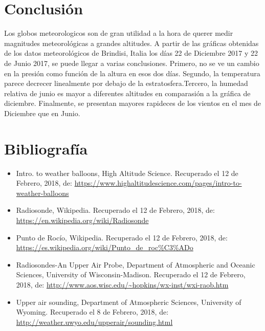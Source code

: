 \documentclass[a4paper]{article}
\begin{document}
\section{Conclusión}

Los globos meteorologicos son de gran utilidad a la hora de querer medir magnitudes meteorológicas a grandes altitudes. A partir de las gráficas obtenidas de los datos meteorológicos de Brindisi, Italia los días 22 de Diciembre 2017 y 22 de Junio 2017, se puede llegar a varias conclusiones. Primero, no se ve un cambio en la presión como función de la altura en esos dos días. Segundo, la temperatura parece decrecer linealmente por debajo de la estratosfera.Tercero, la humedad relativa de junio es mayor a diferentes altitudes en comparasión a la gráfica de diciembre. Finalmente, se presentan mayores rapideces de los vientos en el mes de Diciembre que en Junio. 

\section{Bibliografía}

\begin{itemize}
  \item Intro. to weather balloons, High Altitude Science. Recuperado el 12 de Febrero, 2018, de: \url{https://www.highaltitudescience.com/pages/intro-to-weather-balloons}
  \item Radiosonde, Wikipedia. Recuperado el 12 de Febrero, 2018, de: \url{https://en.wikipedia.org/wiki/Radiosonde}
  \item Punto de Rocío, Wikipedia. Recuperado el 12 de Febrero, 2018, de: \url{https://es.wikipedia.org/wiki/Punto_de_roc%C3%ADo}
  \item Radiosondes-An Upper Air Probe, Department of Atmospheric and Oceanic Sciences, University of Wisconsin-Madison. Recuperado el 12 de Febrero, 2018, de: \url{http://www.aos.wisc.edu/~hopkins/wx-inst/wxi-raob.htm}
  \item Upper air sounding, Department of Atmospheric Sciences, University of Wyoming. Recuperado el 8 de Febrero, 2018, de: \url{http://weather.uwyo.edu/upperair/sounding.html}
\end{itemize} 
\end{document}

